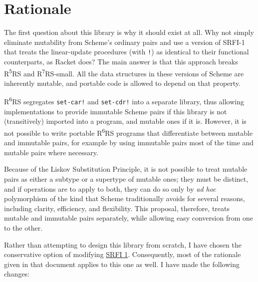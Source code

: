 \section{{Rationale}}\label{rationale}

The first question about this library is why it should exist at all. Why
not simply eliminate mutability from Scheme's ordinary pairs and use a
version of SRFI-1 that treats the linear-update procedures (with
\texttt{!}) as identical to their functional counterparts, as Racket
does? The main answer is that this approach breaks
R\textsuperscript{5}RS and R\textsuperscript{7}RS-small. All the data
structures in these versions of Scheme are inherently mutable, and
portable code is allowed to depend on that property.

R\textsuperscript{6}RS segregates \texttt{set-car!} and
\texttt{set-cdr!} into a separate library, thus allowing implementations
to provide immutable Scheme pairs if this library is not (transitively)
imported into a program, and mutable ones if it is. However, it is not
possible to write portable R\textsuperscript{6}RS programs that
differentiate between mutable and immutable pairs, for example by using
immutable pairs most of the time and mutable pairs where necessary.

Because of the Liskov Substitution Principle, it is not possible to
treat mutable pairs as either a subtype or a supertype of mutable ones;
they must be distinct, and if operations are to apply to both, they can
do so only by \emph{ad hoc} polymorphism of the kind that Scheme
traditionally avoids for several reasons, including clarity, efficiency,
and flexibility. This proposal, therefore, treats mutable and immutable
pairs separately, while allowing easy conversion from one to the other.

Rather than attempting to design this library from scratch, I have
chosen the conservative option of modifying
\href{http://srfi.schemers.org/srfi-1/srfi-1.html}{SRFI 1}.
Consequently, most of the rationale given in that document applies to
this one as well. I have made the following changes:

